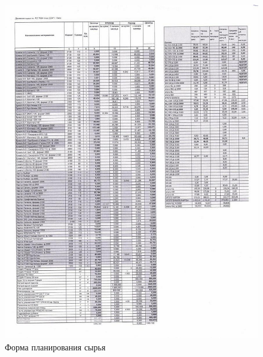\begin{figure}
\begin{center}
  \includegraphics[height=0.9\textheight, keepaspectratio]{Pics/d35.jpg}
\end{center}
  \caption{Форма планирования сырья}
  \label{pic:d35}
\end{figure}
\clearpage

